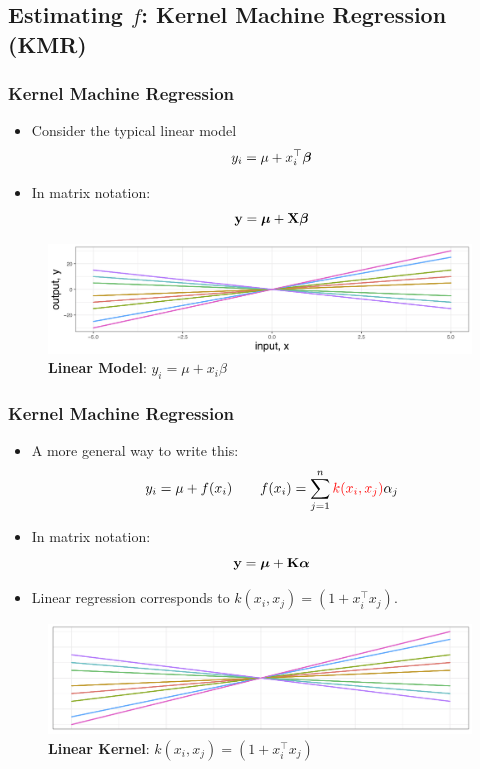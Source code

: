 \documentclass{beamer}
\begin{document}
\subsection{Estimating $f$: Kernel Machine Regression (KMR)}
\begin{frame}
\frametitle{Kernel Machine Regression}
\begin{itemize}
\item Consider the typical linear model
$$y_i=\mu + x_i^\top \boldsymbol{\beta}$$
\item In matrix notation:
$${\bf y} = \boldsymbol{\mu} + {\bf X}\boldsymbol{\beta}$$
\end{itemize}
\vspace{2mm}

\begin{figure}
\centering
\includegraphics[width=.7\linewidth]{./plot/linear_axis} 
\caption{\textbf{Linear Model}: $y_i=\mu + x_i\beta$}
\end{figure}

\end{frame}

\begin{frame}
\frametitle{Kernel Machine Regression}
\begin{itemize}
\item A more general way to write this:
$$y_i=\mu + f(x_i) \qquad f(x_i)=\sum_{j=1}^n {\color{red} k(x_i, x_{j})}\alpha_{j}$$
\item In matrix notation:
$${\bf y} = \boldsymbol{\mu} + {\bf K}\boldsymbol{\alpha}$$
\item Linear regression corresponds to $k(x_i, x_j)=(1+x_i^\top x_j)$.
\end{itemize}

\begin{figure}
\centering
\includegraphics[width=.7\linewidth]{./plot/linear} 
\vspace{-0.2cm}
\caption{\textbf{Linear Kernel}: $k(x_i, x_j)=(1+x_i^\top x_j)$}
\end{figure}
\end{frame}
\end{document}
